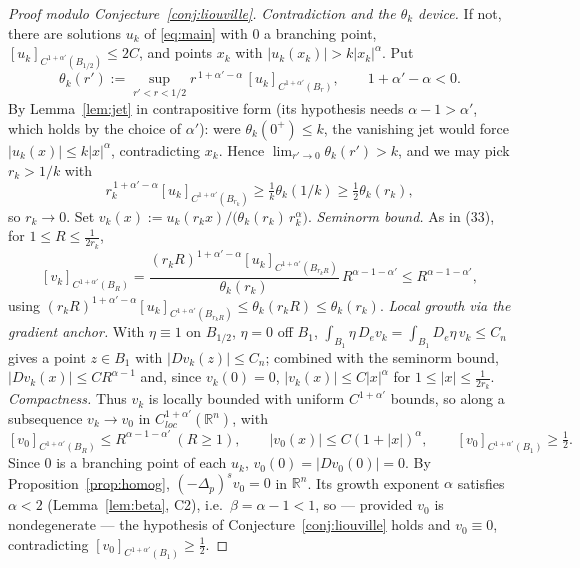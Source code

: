 \documentclass[11pt]{amsart}
\theoremstyle{plain}
\theoremstyle{definition}
\theoremstyle{remark}
\newcommand{\R}{\mathbb{R}}
\newcommand{\fpl}[1]{(-\Delta_p)^{s}#1}            %
\newcommand{\al}{\alpha}
\begin{document}
\begin{proof}[Proof modulo Conjecture~\ref{conj:liouville}]
\emph{Contradiction and the $\theta_k$ device.} If not, there are solutions
$u_k$ of \eqref{eq:main} with $0$ a branching point,
$[u_k]_{C^{1+\al'}(B_{1/2})}\le 2C$, and points $x_k$ with
$|u_k(x_k)|>k|x_k|^{\al}$. Put
\[
  \theta_k(r'):=\sup_{r'<r<1/2} r^{\,1+\al'-\al}\,[u_k]_{C^{1+\al'}(B_r)},
  \qquad 1+\al'-\al<0 .
\]
By Lemma~\ref{lem:jet} in contrapositive form (its hypothesis needs
$\al-1>\al'$, which holds by the choice of $\al'$): were $\theta_k(0^+)\le
k$, the vanishing jet would force $|u_k(x)|\le k|x|^{\al}$, contradicting
$x_k$. Hence $\lim_{r'\to0}\theta_k(r')>k$, and we may pick $r_k>1/k$ with
\[
  r_k^{\,1+\al'-\al}[u_k]_{C^{1+\al'}(B_{r_k})}
  \ge\tfrac1k\theta_k(1/k)\ge\tfrac12\theta_k(r_k),
\]
so $r_k\to0$. Set $v_k(x):=u_k(r_kx)/\big(\theta_k(r_k)\,r_k^{\al}\big)$.
\emph{Seminorm bound.} As in \cite{CP} (33), for $1\le R\le\frac1{2r_k}$,
\[
  [v_k]_{C^{1+\al'}(B_R)}
  =\frac{(r_kR)^{1+\al'-\al}[u_k]_{C^{1+\al'}(B_{r_kR})}}{\theta_k(r_k)}
   \,R^{\al-1-\al'}
  \le R^{\al-1-\al'},
\]
using $(r_kR)^{1+\al'-\al}[u_k]_{C^{1+\al'}(B_{r_kR})}\le\theta_k(r_kR)\le
\theta_k(r_k)$. \emph{Local growth via the gradient anchor.} With
$\eta\equiv1$ on $B_{1/2}$, $\eta=0$ off $B_1$,
$\int_{B_1}\eta\,D_ev_k=\int_{B_1}D_e\eta\,v_k\le C_n$ gives a point $z\in
B_1$ with $|Dv_k(z)|\le C_n$; combined with the seminorm bound,
$|Dv_k(x)|\le CR^{\al-1}$ and, since $v_k(0)=0$, $|v_k(x)|\le C|x|^{\al}$
for $1\le|x|\le\frac1{2r_k}$. \emph{Compactness.} Thus $v_k$ is locally
bounded with uniform $C^{1+\al'}$ bounds, so along a subsequence $v_k\to
v_0$ in $C^{1+\al'}_{loc}(\R^n)$, with
\[
  [v_0]_{C^{1+\al'}(B_R)}\le R^{\al-1-\al'}\ (R\ge1),\qquad
  |v_0(x)|\le C(1+|x|)^{\al},\qquad
  [v_0]_{C^{1+\al'}(B_1)}\ge\tfrac12 .
\]
Since $0$ is a branching point of each $u_k$, $v_0(0)=|Dv_0(0)|=0$. By
Proposition~\ref{prop:homog}, $\fpl{v_0}=0$ in $\R^n$. Its growth exponent
$\al$ satisfies $\al<2$ (Lemma~\ref{lem:beta}, C2), i.e.\ $\beta=\al-1<1$,
so --- provided $v_0$ is nondegenerate --- the hypothesis of
Conjecture~\ref{conj:liouville} holds and $v_0\equiv0$, contradicting
$[v_0]_{C^{1+\al'}(B_1)}\ge\frac12$.
\end{proof}
\end{document}
